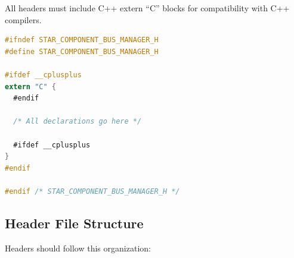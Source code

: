 All headers must include C++ extern ``C'' blocks for compatibility with C++ compilers.

\begin{lstlisting}[language=C]
#ifndef STAR_COMPONENT_BUS_MANAGER_H
#define STAR_COMPONENT_BUS_MANAGER_H

#ifdef __cplusplus
extern "C" {
  #endif
  
  /* All declarations go here */
  
  #ifdef __cplusplus
}
#endif

#endif /* STAR_COMPONENT_BUS_MANAGER_H */
\end{lstlisting}

\subsection{Header File Structure}

Headers should follow this organization:

